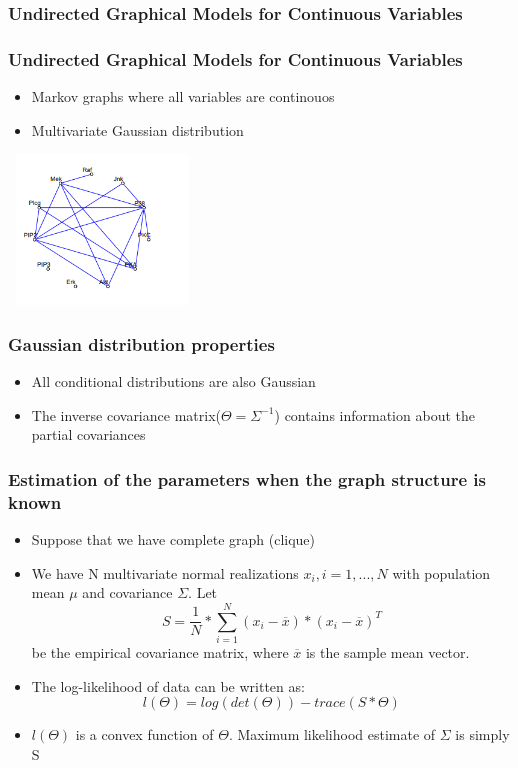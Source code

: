 \documentclass{beamer}
\begin{document}
\begin{frame}
\frametitle{Undirected Graphical Models for Continuous Variables}
\end{frame}
\begin{frame}
\frametitle{Undirected Graphical Models for Continuous Variables}
\begin{itemize}
\item Markov graphs where all variables are continouos
\item Multivariate Gaussian distribution
\end{itemize}
\includegraphics[width=5cm, height=4cm]{Gaussian_image}
\end{frame}
\begin{frame}
\frametitle{Gaussian distribution properties}
\begin{itemize}
\item All conditional distributions are also Gaussian
\item The inverse covariance matrix($\Theta = \Sigma^{-1}$)
contains information about the partial covariances
\end{itemize}
\end{frame}
\begin{frame}
\frametitle{Estimation of the parameters when the graph structure is known}
\begin{itemize}
\item Suppose that we have complete graph (clique)
\item We have N multivariate normal realizations $x_i , i = 1,... ,N$ with population mean $\mu$ and covariance $\Sigma$. Let
\begin{equation}
S=\frac{1}{N}*\sum_{i=1}^{N} (x_i-\overline{x})*(x_i-\overline{x})^T
\end{equation}
be the empirical covariance matrix, where $\overline{x}$ is the sample mean vector.
\item The log-likelihood of data can be written as: 
\begin{equation}
l(\Theta)=log(det(\Theta))-trace(S*\Theta)
\end{equation}
\item $l(\Theta)$ is a convex function of $\Theta$.  Maximum likelihood estimate of $\Sigma$ is simply S 
\end{itemize}
\end{frame}
\end{document}
